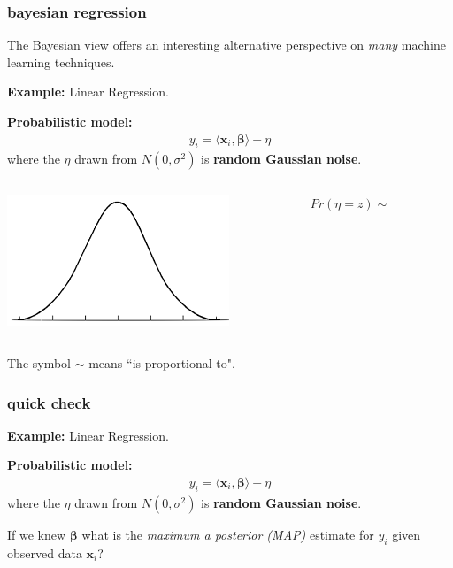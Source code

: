 \documentclass[handout,compress]{beamer}
\newcommand{\bs}[1]{\boldsymbol{#1}}
\newcommand{\bv}[1]{\mathbf{#1}}
\begin{document}
\begin{frame}
	\frametitle{bayesian regression}
	The Bayesian view offers an interesting alternative perspective on \emph{many} machine learning techniques. 
	
	\vspace{2em}
	\textbf{Example:} Linear Regression. 
	
	\textbf{Probabilistic model:}
	\begin{align*}
	 	y_i = \langle \bv{x}_i, \bs{\beta} \rangle+ \eta
	\end{align*}
	where the $\eta$ drawn from $N(0,\sigma^2)$ is \textbf{random Gaussian noise}.
	\vspace{.5em}
	\begin{columns}
		\begin{column}{.5\textwidth}
				\hspace{2em}\includegraphics[width=.7\textwidth]{bell.png}
		\end{column}
		\begin{column}{.5\textwidth}
				$Pr(\eta = z) \sim$
		\end{column}
	\end{columns}
\alert{The symbol $\sim$ means ``is proportional to".}
\end{frame}

\begin{frame}
	\frametitle{quick check}
	\textbf{Example:} Linear Regression. 
	
	\textbf{Probabilistic model:}
	\begin{align*}
	y_i = \langle \bv{x}_i, \bs{\beta} \rangle+ \eta
	\end{align*}
	where the $\eta$ drawn from $N(0,\sigma^2)$ is \textbf{random Gaussian noise}.
	\vspace{.5em}
	
	\begin{center}
		\alert{If we knew $\bs{\beta}$ what is the \emph{maximum a posterior (MAP)} estimate for $y_i$ given observed data $\bv{x}_i$?}
	\end{center}
\end{frame}
\end{document}
